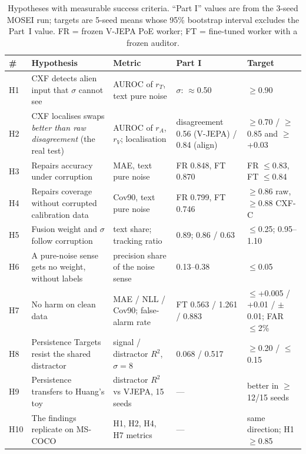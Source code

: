 \documentclass[10pt,twocolumn]{article}
\begin{document}
\begin{table}[!t]
\centering\small
\caption{Hypotheses with measurable success criteria. ``Part I'' values are from the 3-seed MOSEI run; targets are 5-seed means
whose 95\% bootstrap interval excludes the Part~I value. FR = frozen V-JEPA PoE worker; FT = fine-tuned worker with a frozen auditor.}
\label{tab:hyp}
\setlength{\tabcolsep}{4pt}
\footnotesize\begin{tabularx}{\textwidth}{@{}l >{\raggedright}X >{\raggedright}p{3.6cm} >{\raggedright}p{3.3cm} >{\raggedright\arraybackslash}p{3.0cm}@{}}
\toprule
\# & Hypothesis & Metric & Part I & Target\\
\midrule
H1 & CXF detects alien input that $\sigma$ cannot see & AUROC of $r_T$, text pure noise & $\sigma$: $\approx$0.50 & $\geq$0.90\\
H2 & CXF localises swaps \emph{better than raw disagreement} (the real test) & AUROC of $r_A$, $r_V$; localisation & disagreement 0.56 (V-JEPA) / 0.84 (align) & $\geq$0.70 / $\geq$0.85 and $\geq$+0.03\\
H3 & Repairs accuracy under corruption & MAE, text pure noise & FR 0.848, FT 0.870 & FR $\leq$0.83, FT $\leq$0.84\\
H4 & Repairs coverage without corrupted calibration data & Cov90, text pure noise & FR 0.799, FT 0.746 & $\geq$0.86 raw, $\geq$0.88 CXF-C\\
H5 & Fusion weight and $\sigma$ follow corruption & text share; tracking ratio & 0.89; 0.86 / 0.63 & $\leq$0.25; 0.95--1.10\\
H6 & A pure-noise sense gets no weight, without labels & precision share of the noise sense & 0.13--0.38 & $\leq$0.05\\
H7 & No harm on clean data & MAE / NLL / Cov90; false-alarm rate & FT 0.563 / 1.261 / 0.883 & $\leq$+0.005 / +0.01 / $\pm$0.01; FAR $\leq$2\%\\
H8 & Persistence Targets resist the shared distractor & signal / distractor $R^2$, $\sigma=8$ & 0.068 / 0.517 & $\geq$0.20 / $\leq$0.15\\
H9 & Persistence transfers to Huang's toy & distractor $R^2$ vs VJEPA, 15 seeds & --- & better in $\geq$12/15 seeds\\
H10 & The findings replicate on MS-COCO & H1, H2, H4, H7 metrics & --- & same direction; H1 $\geq$0.85\\
\bottomrule
\end{tabularx}
\end{table}
\end{document}
